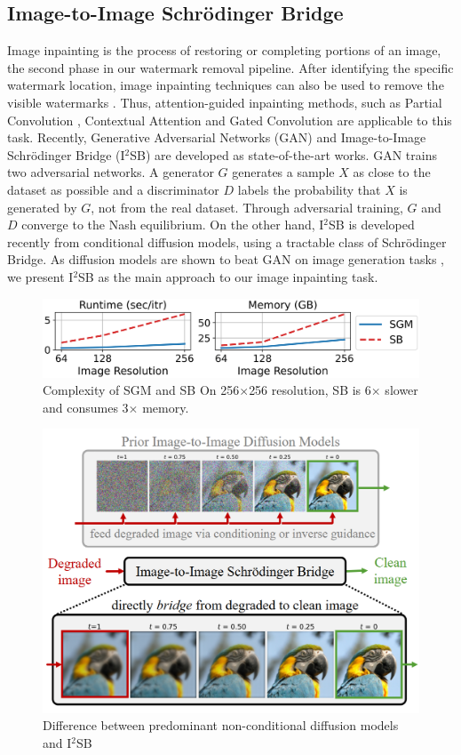 \subsection{Image-to-Image Schrödinger Bridge}
\label{sec:i2sb}
Image inpainting is the process of restoring or completing portions of an image, the second phase in our watermark removal pipeline. After identifying the specific watermark location, image inpainting techniques can also be used to remove the visible watermarks \cite{huang2004attacking}. Thus, attention-guided inpainting methods, such as Partial Convolution \cite{liu2018image}, Contextual Attention \cite{yu2018generative} and Gated Convolution \cite{Yu:2018uw} are applicable to this task. Recently, Generative Adversarial Networks (GAN) \cite{goodfellow2014generative} and Image-to-Image Schrödinger Bridge (I$^2$SB) \cite{liu2023i2sb} are developed as state-of-the-art works. GAN trains two adversarial networks. A generator $G$ generates a sample $X$ as close to the dataset as possible and a discriminator $D$ labels the probability that $X$ is generated by $G$, not from the real dataset. Through adversarial training, $G$ and $D$ converge to the Nash equilibrium. On the other hand, I$^2$SB is developed recently from conditional diffusion models, using a tractable class of Schrödinger Bridge. As diffusion models are shown to beat GAN on image generation tasks \cite{dhariwal2021diffusion}, we present I$^2$SB as the main approach to our image inpainting task.

\begin{figure}[t]
  \begin{center}
    \includegraphics[width=0.85\columnwidth]{img/complexity.png}
    \caption[Complexity of SGM and SB]{
      Complexity of SGM and SB \cite{chen2021likelihood} On 256$\times$256 resolution, SB is 6$\times$ slower and consumes 3$\times$ memory.
    }
    \label{figure:complexity}
  \end{center}
\end{figure}

\begin{figure}[t]
    \centering
    \includegraphics[width=0.6\linewidth]{diffusion-vs-sb.png}
    \caption{Difference between predominant non-conditional diffusion models and I$^2$SB}
    \label{figure:diffusion-vs-sb}
\end{figure}

